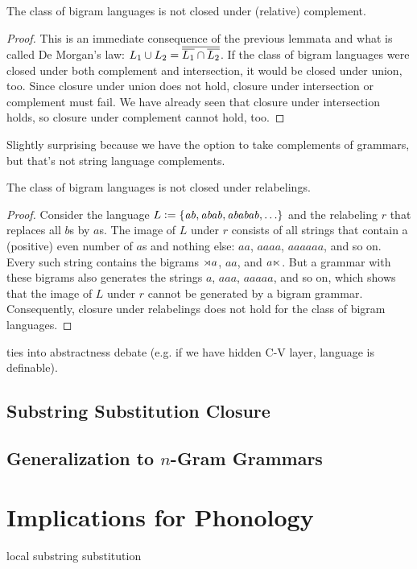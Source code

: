 \begin{lemma}
    The class of bigram languages is not closed under (relative) complement.
\end{lemma}
%
\begin{proof}
    This is an immediate consequence of the previous lemmata and what is called De Morgan's law: $L_1 \cup L_2 =  \overline{ \overline{L_1}  \cap  \overline{L_2} } $.
    If the class of bigram languages were closed under both complement and intersection, it would be closed under union, too.
    Since closure under union does not hold, closure under intersection or complement must fail.
    We have already seen that closure under intersection holds, so closure under complement cannot hold, too.
\end{proof}
%
Slightly surprising because we have the option to take complements of grammars, but that's not string language complements.

\begin{lemma}
    The class of bigram languages is not closed under relabelings.
\end{lemma}
%
\begin{proof}
    Consider the language $L \mathrel{\mathop:}= \left \{ \mathit{ab}, \mathit{abab}, \mathit{ababab}, \ldots \right \}$ and the relabeling $r$ that replaces all $b$s by $a$s.
    The image of $L$ under $r$ consists of all strings that contain a (positive) even number of $a$s and nothing else: $\mathit{aa}$, $\mathit{aaaa}$, $\mathit{aaaaaa}$, and so on.
    Every such string contains the bigrams $\rtimes a$, $\mathit{aa}$, and $a \ltimes$.
    But a grammar with these bigrams also generates the strings $a$, $\mathit{aaa}$, $\mathit{aaaaa}$, and so on, which shows that the image of $L$ under $r$ cannot be generated by a bigram grammar.
    Consequently, closure under relabelings does not hold for the class of bigram languages.
\end{proof}
%
ties into abstractness debate (e.g. if we have hidden C-V layer, language is definable).

\subsection{Substring Substitution Closure}

\subsection{\texorpdfstring{Generalization to $n$-Gram Grammars}{Generalization to n-Gram Grammars}}

\section{Implications for Phonology}


local substring substitution

